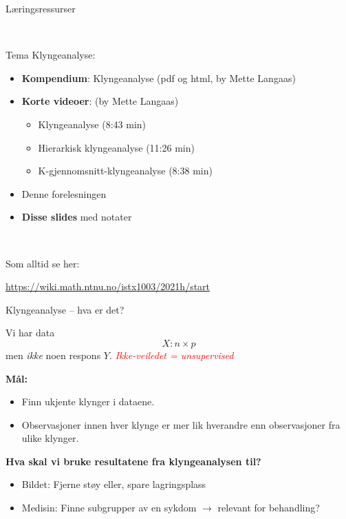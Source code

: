\documentclass[10pt,ignorenonframetext,]{beamer}
\providecommand{\tightlist}{%
  \setlength{\itemsep}{0pt}\setlength{\parskip}{0pt}}
\begin{document}
\begin{frame}{Læringsressurser}
\protect\hypertarget{luxe6ringsressurser}{}

\vspace{2mm}

\(~\)

Tema Klyngeanalyse:

\vspace{2mm}

\begin{itemize}
\item
  \textbf{Kompendium}: Klyngeanalyse (pdf og html, by Mette Langaas)
\item
  \textbf{Korte videoer}: (by Mette Langaas)

  \begin{itemize}
  \tightlist
  \item
    Klyngeanalyse (8:43 min)
  \item
    Hierarkisk klyngeanalyse (11:26 min)
  \item
    K-gjennomsnitt-klyngeanalyse (8:38 min)
  \end{itemize}
\item
  Denne forelesningen
\item
  \textbf{Disse slides} med notater
\end{itemize}

\(~\)

Som alltid se her:

\url{https://wiki.math.ntnu.no/istx1003/2021h/start}

\end{frame}

\begin{frame}{Klyngeanalyse -- hva er det?}
\protect\hypertarget{klyngeanalyse-hva-er-det}{}

Vi har data \[X : n\times p\] men \emph{ikke} noen respons \(Y\).
\emph{\textcolor{red}{Ikke-veiledet = unsupervised}}

\vspace{4mm}

\textbf{Mål:}

\begin{itemize}
\tightlist
\item
  Finn ukjente klynger i dataene.
\item
  Observasjoner innen hver klynge er mer lik hverandre enn observasjoner
  fra ulike klynger.
\end{itemize}

\vspace{2mm}

\textbf{Hva skal vi bruke resultatene fra klyngeanalysen til?}

\begin{itemize}
\tightlist
\item
  Bildet: Fjerne støy eller, spare lagringsplass
\item
  Medisin: Finne subgrupper av en sykdom \(\rightarrow\) relevant for
  behandling?
\end{itemize}

\vspace{2mm}

\end{frame}
\end{document}
